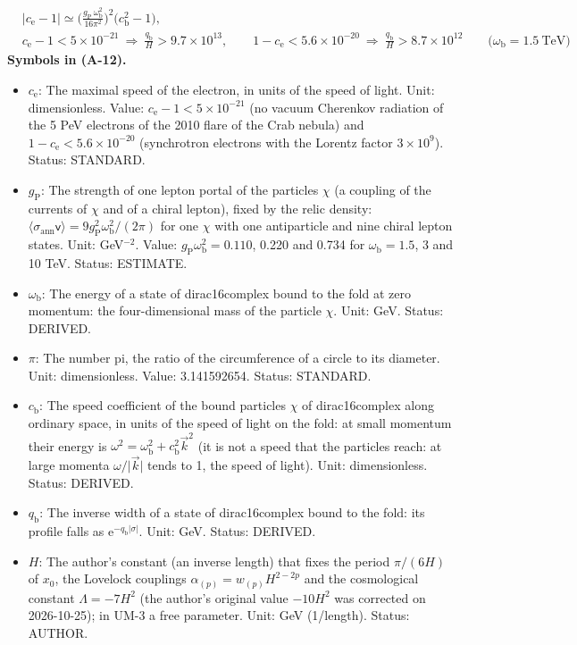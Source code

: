 \documentclass[
  10pt,
]{article}
\providecommand{\tightlist}{%
  \setlength{\itemsep}{0pt}\setlength{\parskip}{0pt}}
\begin{document}
\[
\begin{aligned}
&\lvert c_{\mathrm{e}} - 1\rvert \simeq \Big(\frac{g_{\mathrm{P}}\,\omega_{\mathrm{b}}^2}{16\pi^2}\Big)^2\big(c_{\mathrm{b}}^2 - 1\big),\\
&c_{\mathrm{e}} - 1 < 5\times10^{-21}\ \Rightarrow\ \frac{q_{\mathrm{b}}}{H} > 9.7\times10^{13},\qquad
1 - c_{\mathrm{e}} < 5.6\times10^{-20}\ \Rightarrow\ \frac{q_{\mathrm{b}}}{H} > 8.7\times10^{12}\qquad\big(\omega_{\mathrm{b}} = 1.5\ \text{TeV}\big)
\end{aligned} \tag{A-12}
\] \textbf{Symbols in (A-12).}

\begin{itemize}
\tightlist
\item
  \(c_{\mathrm{e}}\): The maximal speed of the electron, in units of the
  speed of light. Unit: dimensionless. Value:
  \(c_{\mathrm{e}} - 1 < 5\times10^{-21}\) (no vacuum Cherenkov
  radiation of the 5 PeV electrons of the 2010 flare of the Crab nebula)
  and \(1 - c_{\mathrm{e}} < 5.6\times10^{-20}\) (synchrotron electrons
  with the Lorentz factor \(3\times10^9\)). Status: STANDARD.
\item
  \(g_{\mathrm{P}}\): The strength of one lepton portal of the particles
  \(\chi\) (a coupling of the currents of \(\chi\) and of a chiral
  lepton), fixed by the relic density:
  \(\langle\sigma_{\mathrm{ann}}\mathsf{v}\rangle = 9g_{\mathrm{P}}^2\omega_{\mathrm{b}}^2/(2\pi)\)
  for one \(\chi\) with one antiparticle and nine chiral lepton states.
  Unit: GeV\(^{-2}\). Value:
  \(g_{\mathrm{P}}\omega_{\mathrm{b}}^2 = 0.110\), 0.220 and 0.734 for
  \(\omega_{\mathrm{b}} = 1.5\), 3 and 10 TeV. Status: ESTIMATE.
\item
  \(\omega_{\mathrm{b}}\): The energy of a state of dirac16complex bound
  to the fold at zero momentum: the four-dimensional mass of the
  particle \(\chi\). Unit: GeV. Status: DERIVED.
\item
  \(\pi\): The number pi, the ratio of the circumference of a circle to
  its diameter. Unit: dimensionless. Value: 3.141592654. Status:
  STANDARD.
\item
  \(c_{\mathrm{b}}\): The speed coefficient of the bound particles
  \(\chi\) of dirac16complex along ordinary space, in units of the speed
  of light on the fold: at small momentum their energy is
  \(\omega^2 = \omega_{\mathrm{b}}^2 + c_{\mathrm{b}}^2\vec k^2\) (it is
  not a speed that the particles reach: at large momenta
  \(\omega/\lvert\vec k\rvert\) tends to 1, the speed of light). Unit:
  dimensionless. Status: DERIVED.
\item
  \(q_{\mathrm{b}}\): The inverse width of a state of dirac16complex
  bound to the fold: its profile falls as
  \(\mathrm{e}^{-q_{\mathrm{b}}\lvert\sigma\rvert}\). Unit: GeV. Status:
  DERIVED.
\item
  \(H\): The author's constant (an inverse length) that fixes the period
  \(\pi/(6H)\) of \(x_0\), the Lovelock couplings
  \(\alpha_{(p)} = w_{(p)}H^{2-2p}\) and the cosmological constant
  \(\Lambda = -7H^2\) (the author's original value \(-10H^2\) was
  corrected on 2026-10-25); in UM-3 a free parameter. Unit: GeV
  (1/length). Status: AUTHOR.
\end{itemize}
\end{document}
